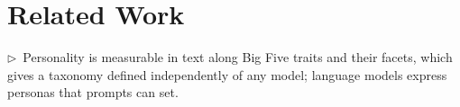 \documentclass[11pt]{article}
\newcommand{\flow}[1]{\par\noindent\textcolor{blue!60!black}{\small$\triangleright$\ #1}\par\medskip}
\begin{document}
\section{Related Work}
%

\flow{Personality is measurable in text along Big Five traits and their facets, which gives a taxonomy defined independently of any model; language models express personas that prompts can set.}
\end{document}

